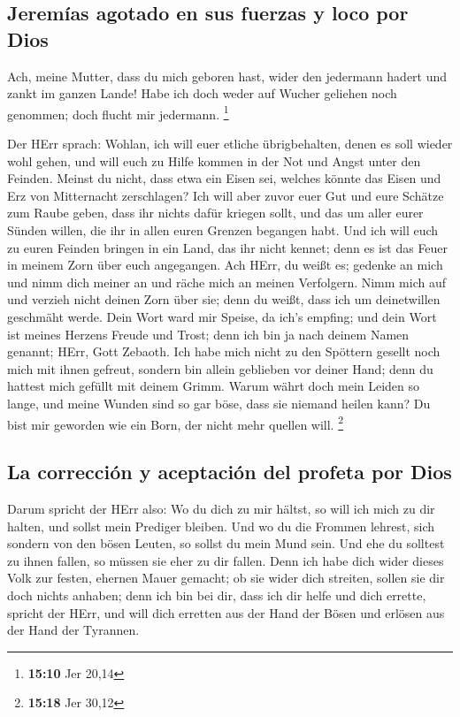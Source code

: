 \hypertarget{jeremuxedas-agotado-en-sus-fuerzas-y-loco-por-dios}{%
\subsection{Jeremías agotado en sus fuerzas y loco por
Dios}\label{jeremuxedas-agotado-en-sus-fuerzas-y-loco-por-dios}}

 Ach, meine Mutter, dass du mich geboren hast, wider den
jedermann hadert und zankt im ganzen Lande! Habe ich doch weder auf
Wucher geliehen noch genommen; doch flucht mir jedermann. \footnote{\textbf{15:10}
  Jer 20,14}

 Der HErr sprach: Wohlan, ich will euer etliche
übrigbehalten, denen es soll wieder wohl gehen, und will euch zu Hilfe
kommen in der Not und Angst unter den Feinden.  Meinst du
nicht, dass etwa ein Eisen sei, welches könnte das Eisen und Erz von
Mitternacht zerschlagen?  Ich will aber zuvor euer Gut
und eure Schätze zum Raube geben, dass ihr nichts dafür kriegen sollt,
und das um aller eurer Sünden willen, die ihr in allen euren Grenzen
begangen habt.  Und ich will euch zu euren Feinden
bringen in ein Land, das ihr nicht kennet; denn es ist das Feuer in
meinem Zorn über euch angegangen.  Ach HErr, du weißt es;
gedenke an mich und nimm dich meiner an und räche mich an meinen
Verfolgern. Nimm mich auf und verzieh nicht deinen Zorn über sie; denn
du weißt, dass ich um deinetwillen geschmäht werde.  Dein
Wort ward mir Speise, da ich's empfing; und dein Wort ist meines Herzens
Freude und Trost; denn ich bin ja nach deinem Namen genannt; HErr, Gott
Zebaoth.  Ich habe mich nicht zu den Spöttern gesellt
noch mich mit ihnen gefreut, sondern bin allein geblieben vor deiner
Hand; denn du hattest mich gefüllt mit deinem Grimm. 
Warum währt doch mein Leiden so lange, und meine Wunden sind so gar
böse, dass sie niemand heilen kann? Du bist mir geworden wie ein Born,
der nicht mehr quellen will. \footnote{\textbf{15:18} Jer 30,12}

\hypertarget{la-correcciuxf3n-y-aceptaciuxf3n-del-profeta-por-dios}{%
\subsection{La corrección y aceptación del profeta por
Dios}\label{la-correcciuxf3n-y-aceptaciuxf3n-del-profeta-por-dios}}

 Darum spricht der HErr also: Wo du dich zu mir hältst,
so will ich mich zu dir halten, und sollst mein Prediger bleiben. Und wo
du die Frommen lehrest, sich sondern von den bösen Leuten, so sollst du
mein Mund sein. Und ehe du solltest zu ihnen fallen, so müssen sie eher
zu dir fallen.  Denn ich habe dich wider dieses Volk zur
festen, ehernen Mauer gemacht; ob sie wider dich streiten, sollen sie
dir doch nichts anhaben; denn ich bin bei dir, dass ich dir helfe und
dich errette, spricht der HErr,  und will dich erretten
aus der Hand der Bösen und erlösen aus der Hand der Tyrannen.

